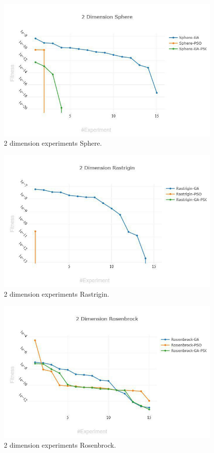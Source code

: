 \documentclass[runningheads]{llncs}
\begin{document}
\begin{figure}[htp]
\includegraphics[width=\textwidth]{2-sphere.jpg}
\caption{2 dimension experiments Sphere.} \label{fig1}
\end{figure}

\begin{figure}[htp]
  \includegraphics[width=\textwidth]{2-rastrigin.jpg}
  \caption{2 dimension experiments Rastrigin.} \label{fig1}
  \end{figure}
  
\begin{figure}[htp]
  \includegraphics[width=\textwidth]{2-rosenbrock.jpg}
  \caption{2 dimension experiments Rosenbrock.} \label{fig1}
  \end{figure}
\end{document}
